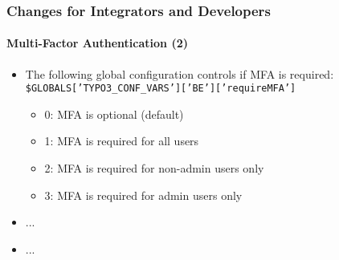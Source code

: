 %

\begin{frame}[fragile]
	\frametitle{Changes for Integrators and Developers}
	\framesubtitle{Multi-Factor Authentication (2)}


	\begin{itemize}
		\item The following global configuration controls if MFA is required:\newline
			\smaller\texttt{\$GLOBALS['TYPO3\_CONF\_VARS']['BE']['requireMFA']}\normalsize
			\begin{itemize}
				\item 0: MFA is optional (default)
				\item 1: MFA is required for all users
				\item 2: MFA is required for non-admin users only
				\item 3: MFA is required for admin users only
			\end{itemize}
		\item ...
		\item ...
	\end{itemize}

\end{frame}

